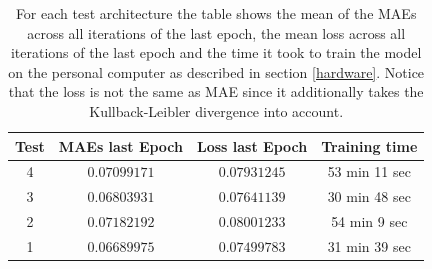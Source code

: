 \begin{center}
    \begin{table}[H]
        \centering
        \begin{tabular}{ | c | c | c | c | }
            \hline
            Test &MAEs last Epoch & Loss last Epoch & Training time\\ \hline
            4 & $0.07099171$  & $0.07931245$  & 53 min 11 sec  \\
            3 & $0.06803931$  & $0.07641139$  & 30 min 48 sec  \\
            2 & $0.07182192$  & $0.08001233$  & 54 min 9 sec  \\  
            1 & $0.06689975$  & $0.07499783$  & 31 min 39 sec  \\  
            \hline
        \end{tabular} 
        \caption{For each test architecture the table shows the mean of the MAEs across all iterations of the last
        epoch, the mean loss across all iterations of the last epoch and the time it took to train the model
        on the personal computer as described in section \ref{hardware}. Notice that the loss is not the same
        as MAE since it additionally takes the Kullback-Leibler divergence into account.}
    \end{table} \label{table_maes4}
\end{center}

